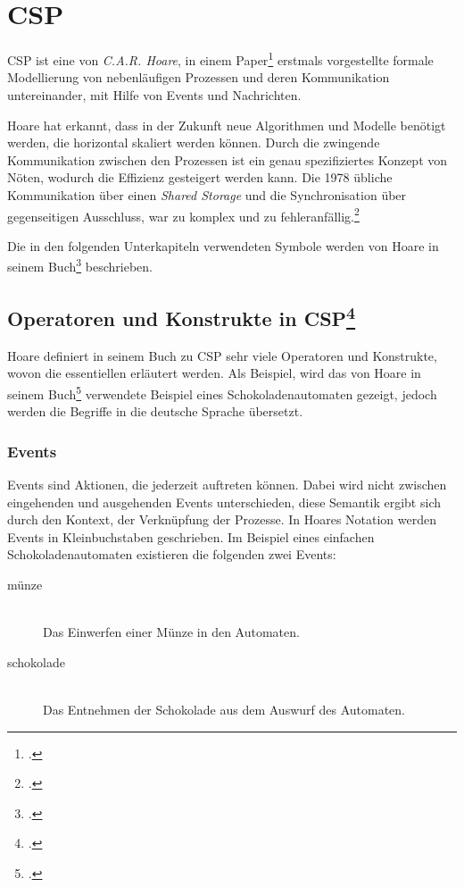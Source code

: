 \section{\acl{CSP}}
\acf{CSP} ist eine von \textit{C.A.R. Hoare}, in einem Paper\footcite{CSP} erstmals vorgestellte formale Modellierung von nebenläufigen Prozessen und deren Kommunikation untereinander, mit Hilfe von Events und Nachrichten.

Hoare hat erkannt, dass in der Zukunft neue Algorithmen und Modelle benötigt werden, die horizontal skaliert werden können. Durch die zwingende Kommunikation zwischen den Prozessen ist ein genau spezifiziertes Konzept von Nöten, wodurch die Effizienz gesteigert werden kann. Die 1978 übliche Kommunikation über einen \textit{Shared Storage} und die Synchronisation über gegenseitigen Ausschluss, war zu komplex und zu fehleranfällig.\footcite[Introduction]{CSP}

Die in den folgenden Unterkapiteln verwendeten Symbole werden von Hoare in seinem Buch\footcite[Glossary of Symbols]{CSPBOOK} beschrieben.

\subsection[Operatoren und Konstrukte in \acs{CSP}]{Operatoren und Konstrukte in \acs{CSP}\footcite[Siehe][Kap. 1.1]{CSPBOOK}}

Hoare definiert in seinem Buch zu \ac{CSP} sehr viele Operatoren und Konstrukte, wovon die essentiellen  erläutert werden. Als Beispiel, wird das von Hoare in seinem Buch\footcite{CSPBOOK} verwendete Beispiel eines Schokoladenautomaten gezeigt, jedoch werden die Begriffe in die deutsche Sprache übersetzt.

\subsubsection{Events}
Events sind Aktionen, die jederzeit auftreten können. Dabei wird nicht zwischen eingehenden und ausgehenden Events unterschieden, diese Semantik ergibt sich durch den Kontext, der Verknüpfung der Prozesse. In Hoares Notation werden Events in Kleinbuchstaben geschrieben.
Im Beispiel eines einfachen Schokoladenautomaten existieren die folgenden zwei Events:

\begin{description}
\item[münze]\hfill \\
Das Einwerfen einer Münze in den Automaten.
\item[schokolade]\hfill \\
Das Entnehmen der Schokolade aus dem Auswurf des Automaten.
\end{description}

